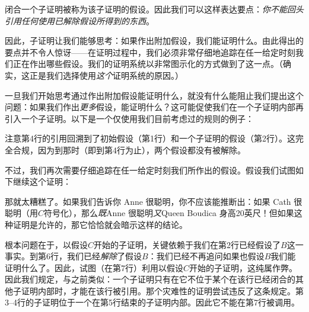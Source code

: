 闭合一个子证明被称为该子证明的假设。因此我们可以这样表达要点：\emph{你不能回头引用任何使用已解除假设所得到的东西}。

因此，子证明让我们能够思考：如果作出附加假设，我们能证明什么。由此得出的要点并不令人惊讶——在证明过程中，我们必须非常仔细地追踪在任一给定时刻我们正在作出哪些假设。我们的证明系统以非常图示化的方式做到了这一点。（确实，这正是我们选择使用\emph{这个}证明系统的原因。）

一旦我们开始思考通过作出附加假设能证明什么，就没有什么能阻止我们提出这个问题：如果我们作出\emph{更多}假设，能证明什么？这可能促使我们在一个子证明内部再引入一个子证明。以下是一个仅使用我们目前考虑过的规则的例子：


\begin{fitchproof}
\PR
\open
	\AS
	\open
		\AS
	\close
\close
{}
\end{fitchproof}


注意第4行的引用回溯到了初始假设（第1行）和一个子证明的假设（第2行）。这完全合规，因为到那时（即到第4行为止），两个假设都没有被解除。

不过，我们再次需要仔细追踪在任一给定时刻我们所作出的假设。假设我们试图如下继续这个证明：


\begin{fitchproof}
\PR
\open
	\AS
	\open
		\AS
	\close
\close
{}
\ifHTMLtarget
\else
	 
\fi
\end{fitchproof}


那就太糟糕了。如果我们告诉你 Anne 很聪明，你不应该能推断出：如果 Cath 很聪明（用$C$符号化），那么\emph{既}Anne 很聪明\emph{又}Queen Boudica 身高20英尺！但如果这种证明是允许的，那它恰恰就会暗示这样的结论。

根本问题在于，以假设$C$开始的子证明，关键依赖于我们在第2行已经假设了$B$这一事实。到第6行，我们已经\emph{解除}了假设$B$：我们已经不再追问如果也假设$B$我们能证明什么了。因此，试图（在第7行）利用以假设$C$开始的子证明，这纯属作弊。因此我们规定，与之前类似：一个子证明只有在它不位于某个在该行已经闭合的其他子证明内部时，才能在该行被引用。那个灾难性的证明尝试违反了这条规定。第3–4行的子证明位于一个在第5行结束的子证明内部。因此它不能在第7行被调用。

